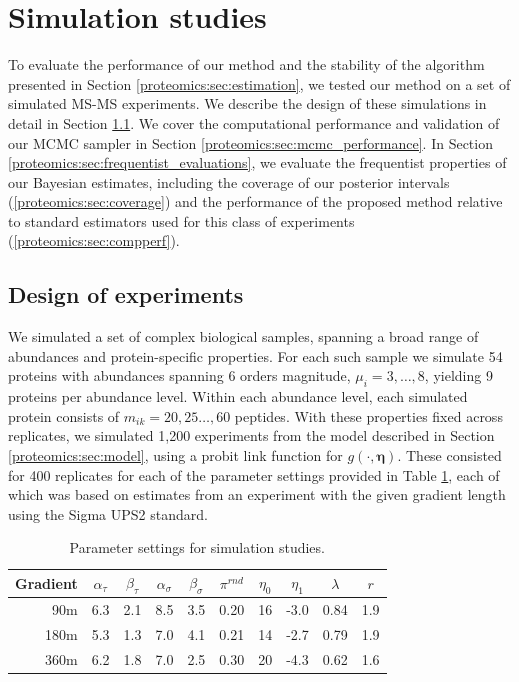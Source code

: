 

\section{Simulation studies}
\label{proteomics:sec:simulations}

To evaluate the performance of our method and the stability of the algorithm presented in Section \ref{proteomics:sec:estimation}, we tested our method on a set of simulated MS-MS experiments.
We describe the design of these simulations in detail in Section \ref{proteomics:sec:doe}.
We cover the computational performance and validation of our MCMC sampler in Section \ref{proteomics:sec:mcmc_performance}.
In Section \ref{proteomics:sec:frequentist_evaluations}, we evaluate the frequentist properties of our Bayesian estimates, including the coverage of our posterior intervals (\ref{proteomics:sec:coverage}) and the performance of the proposed method relative to standard estimators used for this class of experiments (\ref{proteomics:sec:compperf}).


\subsection{Design of experiments}
\label{proteomics:sec:doe}

We simulated a set of complex biological samples, spanning a broad range of abundances and protein-specific properties.
For each such sample we simulate 54 proteins with abundances spanning 6 orders magnitude, $\mu_i= 3, \ldots, 8$, yielding 9 proteins per abundance level.
Within each abundance level, each simulated protein consists of $m_{ik}=20,25\ldots,60$ peptides.
With these properties fixed across replicates, we simulated 1,200 experiments from the model described in Section \ref{proteomics:sec:model}, using a probit link function for $g(\cdot, \bm \eta)$.
These consisted for 400 replicates for each of the parameter settings provided in Table \ref{proteomics:table:sim_parameters}, each of which was based on estimates from an experiment with the given gradient length using the Sigma UPS2 standard.

\ifx\nofigures\undefined
\begin{table}
\begin{center}
\caption{Parameter settings for simulation studies.
\label{proteomics:table:sim_parameters}}
\begin{tabular}{r|ccccccccc}
  \hline
Gradient & $\alpha_\tau$ & $\beta_\tau$ & $\alpha_\sigma$ & $\beta_\sigma$ & $\pi^{rnd}$ & $\eta_0$ & $\eta_1$ & $\lambda$ & $r$ \\ 
  \hline
   90m & 6.3 & 2.1 & 8.5 & 3.5 & 0.20 & 16 & -3.0 & 0.84 & 1.9 \\ 
  180m & 5.3 & 1.3 & 7.0 & 4.1 & 0.21 & 14 & -2.7 & 0.79 & 1.9 \\ 
  360m & 6.2 & 1.8 & 7.0 & 2.5 & 0.30 & 20 & -4.3 & 0.62 & 1.6 \\ 
   \hline
\end{tabular}
\end{center}
\end{table}
\fi

